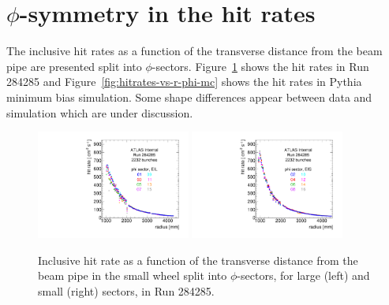 \section{$\phi$-symmetry in the hit rates}
\label{sec:phisymmetry}

The inclusive hit rates as a function of the transverse distance from the beam pipe are presented split into $\phi$-sectors. Figure~\ref{fig:hitrates-vs-r-phi-data} shows the hit rates in Run 284285 and Figure~\ref{fig:hitrates-vs-r-phi-mc} shows the hit rates in Pythia minimum bias simulation. Some shape differences appear between data and simulation which are under discussion.

\begin{figure}
  \begin{center}
    \includegraphics[width=0.45\textwidth]{./figures/rate_raw_vs_r_phi_EIL_00284285.pdf}
    \includegraphics[width=0.45\textwidth]{./figures/rate_raw_vs_r_phi_EIS_00284285.pdf}
    \caption{Inclusive hit rate as a function of the transverse distance from the beam pipe in the small wheel split into $\phi$-sectors, for large (left) and small (right) sectors, in Run 284285.}
    \label{fig:hitrates-vs-r-phi-data}
  \end{center}
\end{figure}

